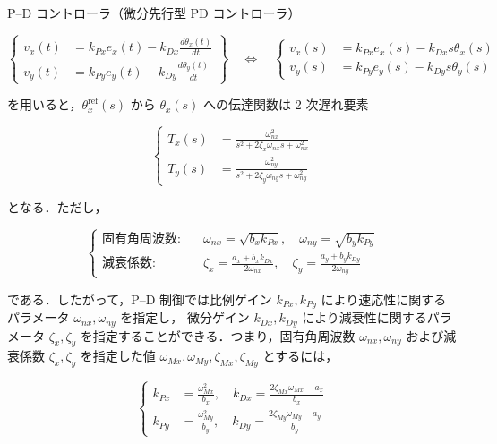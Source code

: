P--D コントローラ（微分先行型 PD コントローラ）

\begin{equation}
\left\{
\begin{aligned}
    v_x(t) &= k_{Px} e_x(t) - k_{Dx} \frac{d\theta_x(t)}{dt} \\
    v_y(t) &= k_{Py} e_y(t) - k_{Dy} \frac{d\theta_y(t)}{dt}
\end{aligned}
\right\}
\quad \Longleftrightarrow \quad
\left\{
\begin{aligned}
    v_x(s) &= k_{Px} e_x(s) - k_{Dx} s \theta_x(s) \\
    v_y(s) &= k_{Py} e_y(s) - k_{Dy} s \theta_y(s)
\end{aligned}
\right.
\tag{5.7}
\end{equation}

を用いると，$\theta_x^{\text{ref}}(s)$ から $\theta_x(s)$ への伝達関数は 2 次遅れ要素

\begin{equation}
\left\{
\begin{aligned}
    T_x(s) &= \frac{\omega_{nx}^2}{s^2 + 2\zeta_x \omega_{nx}s + \omega_{nx}^2} \\
    T_y(s) &= \frac{\omega_{ny}^2}{s^2 + 2\zeta_y \omega_{ny}s + \omega_{ny}^2}
\end{aligned}
\right.
\tag{5.8}
\end{equation}

となる．ただし，

\begin{equation}
\left\{
\begin{aligned}
    \text{固有角周波数:} &\quad \omega_{nx} = \sqrt{b_x k_{Px}}, \quad \omega_{ny} = \sqrt{b_y k_{Py}} \\
    \text{減衰係数:} &\quad \zeta_x = \frac{a_x + b_x k_{Dx}}{2 \omega_{nx}}, \quad \zeta_y = \frac{a_y + b_y k_{Dy}}{2 \omega_{ny}}
\end{aligned}
\right.
\tag{5.9}
\end{equation}

である．したがって，P--D 制御では比例ゲイン $k_{Px}, k_{Py}$ により速応性に関するパラメータ $\omega_{nx}, \omega_{ny}$ を指定し，
微分ゲイン $k_{Dx}, k_{Dy}$ により減衰性に関するパラメータ $\zeta_x, \zeta_y$ を指定することができる．つまり，固有角周波数
$\omega_{nx}, \omega_{ny}$ および減衰係数 $\zeta_x, \zeta_y$ を指定した値 $\omega_{Mx}, \omega_{My}, \zeta_{Mx}, \zeta_{My}$ とするには，

\begin{equation}
\left\{
\begin{aligned}
    k_{Px} &= \frac{\omega_{Mx}^2}{b_x}, \quad
    k_{Dx} = \frac{2\zeta_{Mx} \omega_{Mx} - a_x}{b_x} \\
    k_{Py} &= \frac{\omega_{My}^2}{b_y}, \quad
    k_{Dy} = \frac{2\zeta_{My} \omega_{My} - a_y}{b_y}
\end{aligned}
\right.
\tag{5.10}
\end{equation}

